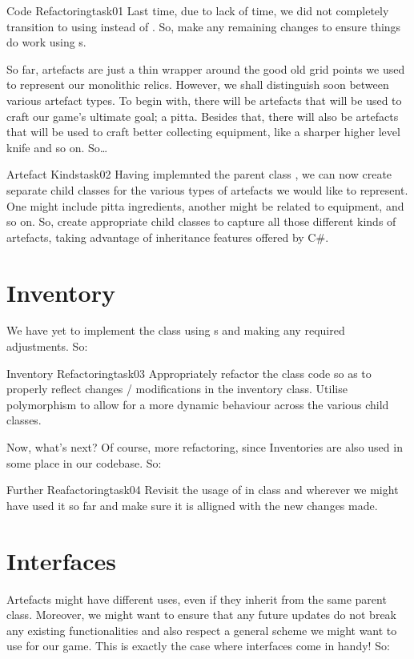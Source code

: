 \documentclass[a4paper, 11pt]{article}
\numberwithin{equation}{section}
\theoremstyle{definition}
\begin{document}
\begin{task}{Code Refactoring}{task01}
    Last time, due to lack of time, we did not completely transition to using  instead of . So, make any remaining changes to ensure things do work using s.
\end{task}

So far, artefacts are just a thin wrapper around the good old grid points we used to represent our monolithic relics. However, we shall distinguish soon between various artefact types. To begin with, there will be artefacts that will be used to craft our game's ultimate goal; a pitta. Besides that, there will also be artefacts that will be used to craft better collecting equipment, like a sharper higher level knife and so on. So\ldots

\begin{task}{Artefact Kinds}{task02}
    Having implemnted the parent class , we can now create separate child classes for the various types of artefacts we would like to represent. One might include pitta ingredients, another might be related to equipment, and so on. So, create appropriate child classes to capture all those different kinds of artefacts, taking advantage of inheritance features offered by C\#.
\end{task}
%
%
%
\section{Inventory}
%
We have yet to implement the  class using s and making any required adjustments. So:
\begin{task}{Inventory Refactoring}{task03}
    Appropriately refactor the  class code so as to properly reflect changes / modifications in the inventory class. Utilise polymorphism to allow for a more dynamic behaviour across the various  child classes.
\end{task}

Now, what's next? Of course, more refactoring, since Inventories are also used in some place in our codebase. So:

\begin{task}{Further Reafactoring}{task04}
    Revisit the usage of  in  class and wherever we might have used it so far and make sure it is alligned with the new changes made.
\end{task}

\section{Interfaces}
%
Artefacts might have different uses, even if they inherit from the same parent class. Moreover, we might want to ensure that any future updates do not break any existing functionalities and also respect a general scheme we might want to use for our game. This is exactly the case where interfaces come in handy! So:
\end{document}
